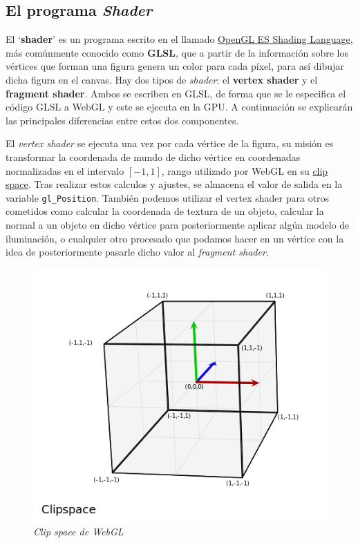 \subsection{El programa \textit{Shader}}

El `\textbf{shader}' es un programa escrito en el llamado \href{https://www.khronos.org/registry/OpenGL/specs/es/3.2/GLSL_ES_Specification_3.20.pdf}{OpenGL ES Shading Language}, más comúnmente conocido como \textbf{GLSL}, que a partir de la información sobre los vértices que forman una figura genera un color para cada píxel, para así dibujar dicha figura en el canvas. Hay dos tipos de \textit{shader}: el \textbf{vertex shader} y el \textbf{fragment shader}. Ambos se escriben en GLSL, de forma que se le especifica el código GLSL a WebGL y este se ejecuta en la GPU. A continuación se explicarán las principales diferencias entre estos dos componentes.

El \textit{vertex shader} se ejecuta una vez por cada vértice de la figura, su misión es transformar la coordenada de mundo de dicho vértice en coordenadas normalizadas en el intervalo $[-1,1]$, rango utilizado por WebGL en su \href{https://developer.mozilla.org/en-US/docs/Web/API/WebGL_API/WebGL_model_view_projection#clip_space}{clip space}. Tras realizar estos calculos y ajustes, se almacena el valor de salida en la variable \verb|gl_Position|. También podemos utilizar el vertex shader para otros cometidos como calcular la coordenada de textura de un objeto, calcular la normal a un objeto en dicho vértice para posteriormente aplicar algún modelo de iluminación, o cualquier otro procesado que podamos hacer en un vértice con la idea de posteriormente pasarle dicho valor al \textit{fragment shader}.


\begin{figure} [ht]
    \centering
    \includegraphics[scale = 0.5]{img/C5/clip-space-graph.png}
    \caption{\textit{Clip space de WebGL}}
    \label{fig:clipspace}
\end{figure}

